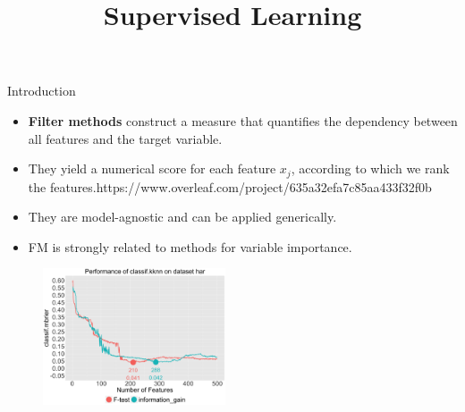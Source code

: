 \documentclass[11pt,compress,t,notes=noshow, xcolor=table]{beamer}
\title{Supervised Learning}
\date{}
\begin{document}

  \begin{vbframe}{Introduction}
  \vspace{-0.3cm}
  \begin{itemize}
  \setlength{\itemsep}{0.8em}
    \item \textbf{Filter methods} construct a measure that quantifies the dependency between all features and the target variable.
    \item They yield a numerical score for each feature $x_j$, according to which we rank the features.https://www.overleaf.com/project/635a32efa7c85aa433f32f0b
    \item They are model-agnostic and can be applied generically.
    \item FM is strongly related to methods for variable importance.
  \end{itemize}
\vspace{-0.2cm}
  \begin{center}
  \begin{figure}
    \includegraphics[width=0.48\textwidth]{figure/filter_comparison_har_classif.kknn.png}
  \end{figure}
  \end{center}
  
  \end{vbframe}

%
%
\end{document}
